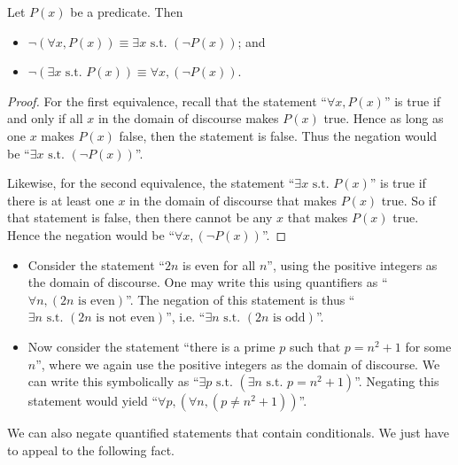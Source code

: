 \begin{proposition}
    Let $P(x)$ be a predicate. Then
    \begin{itemize}
        \item $\lnot(\forall x, P(x)) \equiv \exists x \text{ s.t. } (\lnot P(x))$; and
        \item $\lnot(\exists x \text{ s.t. } P(x)) \equiv \forall x, (\lnot P(x))$.
    \end{itemize}
\end{proposition}
\begin{proof}
    For the first equivalence, recall that the statement ``$\forall x, P(x)$'' is true if and only if all $x$ in the domain of discourse makes $P(x)$ true. Hence as long as one $x$ makes $P(x)$ false, then the statement is false. Thus the negation would be ``$\exists x \text{ s.t. } (\lnot P(x))$''.

    Likewise, for the second equivalence, the statement ``$\exists x \text{ s.t. } P(x)$'' is true if there is at least one $x$ in the domain of discourse that makes $P(x)$ true. So if that statement is false, then there cannot be any $x$ that makes $P(x)$ true. Hence the negation would be ``$\forall x, (\lnot P(x))$''.
\end{proof}

\begin{example}
    \begin{itemize}[leftmargin=*]
        \item Consider the statement ``$2n$ is even for all $n$'', using the positive integers as the domain of discourse. One may write this using quantifiers as ``$\forall n, (2n \text{ is even})$''. The negation of this statement is thus ``$\exists n \text{ s.t. } (2n \text{ is not even})$'', i.e. ``$\exists n \text{ s.t. } (2n \text{ is odd})$''.
        \item Now consider the statement ``there is a prime $p$ such that $p = n^2 + 1$ for some $n$'', where we again use the positive integers as the domain of discourse. We can write this symbolically as ``$\exists p \text{ s.t. } (\exists n \text{ s.t. } p = n^2 + 1)$''. Negating this statement would yield ``$\forall p, (\forall n, (p \neq n^2 + 1))$''.
    \end{itemize}
\end{example}

We can also negate quantified statements that contain conditionals. We just have to appeal to the following fact.

